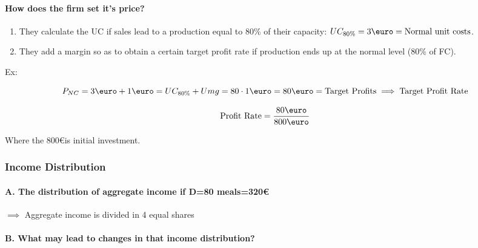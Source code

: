\documentclass{report}
\begin{document}
\paragraph{How does the firm set it's price?}

\begin{enumerate}
    \item They calculate the UC if sales lead to a production equal to 80\% of their capacity: $UC_{80\%}=3\text{\euro}=\text{Normal unit costs}$. 
    \item They add a margin so as to obtain a certain target profit rate if production ends up at the normal level (80\% of FC).
\end{enumerate}

Ex: 

$$
P_{NC}=3\text{\euro}+1\text{\euro}=UC_{80\%}+Umg=
80\cdot1\text{\euro}=80\text{\euro}=\text{Target Profits}\implies\text{Target Profit Rate}
$$

$$
\text{Profit Rate}=\frac{80 \text{\euro}}{800 \text{\euro}}
$$

Where the 800\euro is initial investment. 

\subsubsection{Income Distribution}

\paragraph{A. The distribution of aggregate income if D=80 meals=320\euro}

$\implies$ Aggregate income is divided in 4 equal shares

\paragraph{B. What may lead to changes in that income distribution?}
\end{document}
